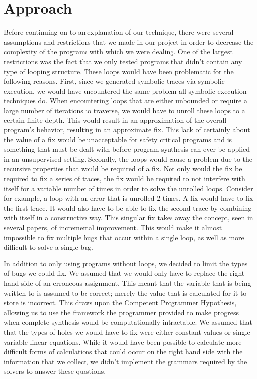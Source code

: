 \documentclass[]{article}
\begin{document}
\section{Approach}
Before continuing on to an explanation of our technique, there were several
assumptions and restrictions that we made in our project in order to
decrease the complexity of the programs with which we were dealing.  One of
the largest restrictions was the fact that we only tested programs that
didn't contain any type of looping structure.  These loops would have been
problematic for the following reasons.  First, since we generated symbolic
traces via symbolic execution, we would have encountered the same problem
all symbolic execution techniques do.  When encountering loops that are
either unbounded or require a large number of iterations to traverse, we
would have to unroll these loops to a certain finite depth.  This would
result in an approximation of the overall program's behavior, resulting in
an approximate fix.  This lack of certainly about the value of a fix would
be unacceptable for safety critical programs and is something that must be
dealt with before program synthesis can ever be applied in an unsupervised
setting.  Secondly, the loops would cause a problem due to the recursive
properties that would be required of a fix.  Not only would the fix be
required to fix a series of traces, the fix would be required to not
interfere with itself for a variable number of times in order to solve the
unrolled loops.  Consider for example, a loop with an error that is unrolled
2 times.  A fix would have to fix the first trace.  It would also have to be
able to fix the second trace by combining with itself in a constructive way.
This singular fix takes away the concept, seen in several papers, of
incremental improvement.  This would make it almost impossible to fix
multiple bugs that occur within a single loop, as well as more difficult to
solve a single bug.

In addition to only using programs without loops, we decided to limit the
types of bugs we could fix.  We assumed that we would only have to replace
the right hand side of an erroneous assignment.  This meant that the
variable that is being written to is assumed to be correct; merely the value
that is calculated for it to store is incorrect.  This draws upon the
Competent Programmer Hypothesis, allowing us to use the framework the
programmer provided to make progress when complete synthesis would be
computationally intractable.  We assumed that that the types of holes we
would have to fix were either constant values or single variable linear
equations.  While it would have been possible to calculate more difficult
forms of calculations that could occur on the right hand side with the
information that we collect, we didn't implement the grammars required by
the solvers to answer these questions.
\end{document}
